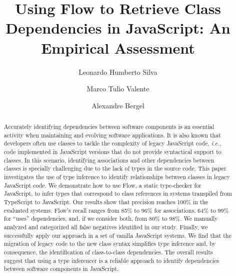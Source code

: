 \documentclass[review]{elsarticle}
\newcommand{\aspas}[1]{{``#1''}}
\newcommand{\ab}[1]{\nb{Alexandre}{blue}{#1}}
\begin{document}
\begin{frontmatter}

\title{Using Flow to Retrieve Class Dependencies in JavaScript: An Empirical Assessment}



\author[mymainaddress]{Leonardo Humberto Silva}

\author[mtovaddress]{Marco Tulio Valente}

\author[bergeladdress]{Alexandre Bergel}

\address[mymainaddress]{Federal Institute of Northern Minas Gerais}
\address[mtovaddress]{Federal University of Minas Gerais}
\address[bergeladdress]{ISCLab, DCC, University of Chile}

\begin{abstract}
Accurately identifying dependencies between software components is an essential activity when maintaining and evolving software applications. It is also known that developers often use classes to tackle the complexity of legacy JavaScript code, \emph{i.e.}, code implemented in JavaScript versions that do not provide syntactical support to classes. In this scenario, identifying associations and other dependencies between classes is specially challenging due to the lack of types in the source code. This paper investigates the use of type inference to identify relationships between classes in legacy JavaScript code. We demonstrate how to use Flow, a static type-checker for JavaScript, to infer types that correspond to class references in systems transpiled from TypeScript to JavaScript. Our results show that precision reaches 100\% in the evaluated systems. Flow's recall ranges from 85\% to 96\% for associations, 64\% to 99\% for \aspas{uses} dependencies, and, if we consider both, from 80\% to 98\%. We manually analyzed and categorized all false negatives identified in our study. Finally, we successfully apply our approach in a set of vanilla JavaScript systems. We find that the migration of legacy code to the new class syntax simplifies type inference and, by consequence, the identification of class-to-class dependencies. The overall results suggest that using a type inferencer is a reliable approach to identify dependencies between software components in JavaScript.
\end{abstract}


\end{frontmatter}
\end{document}
